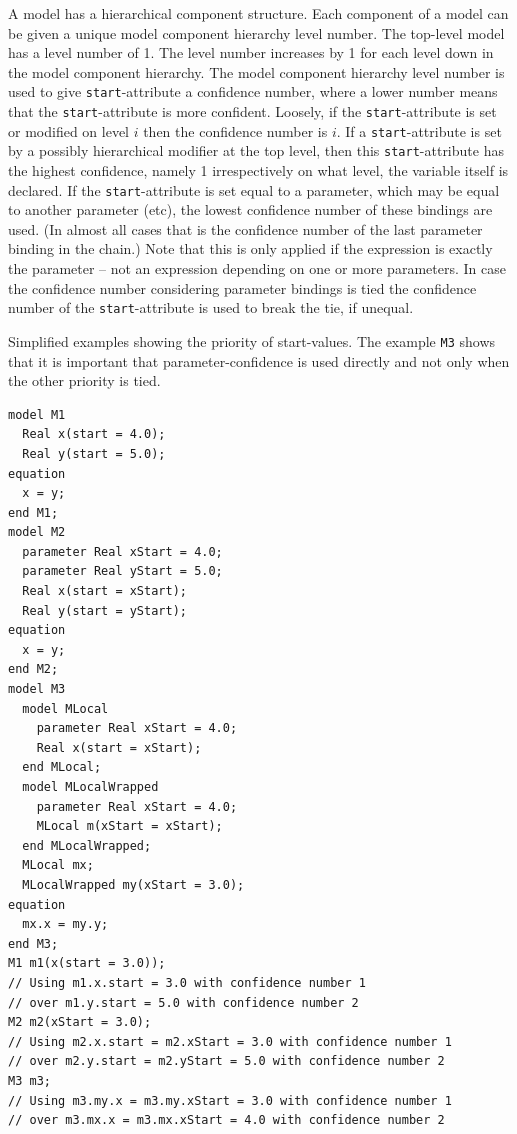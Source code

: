 \begin{nonnormative}
A model has a hierarchical component structure.
Each component of a model can be given a unique model component hierarchy level number.
The top-level model has a level number of 1.
The level number increases by 1 for each level down in the model component hierarchy.
The model component hierarchy level number is used to give \lstinline!start!-attribute a confidence number, where a lower number means that the \lstinline!start!-attribute is more confident.
Loosely, if the \lstinline!start!-attribute is set or modified on level $i$ then the confidence number is $i$.
If a \lstinline!start!-attribute is set by a possibly hierarchical modifier at the top level, then this \lstinline!start!-attribute has the highest confidence, namely 1 irrespectively on what level, the variable itself is declared.
If the \lstinline!start!-attribute is set equal to a parameter, which may be equal to another parameter (etc), the lowest confidence number of these bindings are used.
(In almost all cases that is the confidence number of the last parameter binding in the chain.)
Note that this is only applied if the expression is exactly the parameter -- not an expression depending on one or more parameters.
In case the confidence number considering parameter bindings is tied the confidence number of the \lstinline!start!-attribute is used to break the tie, if unequal.
\begin{example}
Simplified examples showing the priority of start-values.
The example \lstinline!M3! shows that it is important that parameter-confidence is used directly and not only when the other priority is tied.
\begin{lstlisting}[language=modelica]
model M1
  Real x(start = 4.0);
  Real y(start = 5.0);
equation
  x = y;
end M1;
model M2
  parameter Real xStart = 4.0;
  parameter Real yStart = 5.0;
  Real x(start = xStart);
  Real y(start = yStart);
equation
  x = y;
end M2;
model M3
  model MLocal
    parameter Real xStart = 4.0;
    Real x(start = xStart);
  end MLocal;
  model MLocalWrapped
    parameter Real xStart = 4.0;
    MLocal m(xStart = xStart);
  end MLocalWrapped;
  MLocal mx;
  MLocalWrapped my(xStart = 3.0);
equation
  mx.x = my.y;
end M3;
M1 m1(x(start = 3.0));
// Using m1.x.start = 3.0 with confidence number 1
// over m1.y.start = 5.0 with confidence number 2
M2 m2(xStart = 3.0);
// Using m2.x.start = m2.xStart = 3.0 with confidence number 1
// over m2.y.start = m2.yStart = 5.0 with confidence number 2
M3 m3;
// Using m3.my.x = m3.my.xStart = 3.0 with confidence number 1
// over m3.mx.x = m3.mx.xStart = 4.0 with confidence number 2
\end{lstlisting}
\end{example}
\end{nonnormative}
